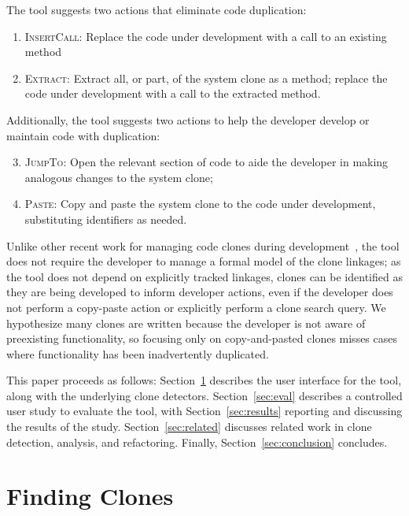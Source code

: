 \documentclass[nocopyrightspace,10pt]{sigplanconf}
\begin{document}
The tool suggests two actions that eliminate code duplication:

\begin{enumerate}
  \item \textsc{InsertCall}: Replace the code under development with a call to an existing method
  \item \textsc{Extract}: Extract all, or part, of the system clone as a method;
    replace the code under development with a call to the extracted
    method.
\end{enumerate}

\noindent Additionally, the tool suggests two actions to help the developer
develop or maintain code with duplication:

\begin{enumerate}
\setcounter{enumi}{2}
  \item \textsc{JumpTo}: Open the relevant section of code to aide the
    developer in making analogous changes to the system clone;
  \item \textsc{Paste}: Copy and paste the system clone to the code under development,
    substituting identifiers as needed.
\end{enumerate}

Unlike other recent work for managing code clones during
development~\cite{deWit2009, Duala-Ekoko2007}, the tool does not
require the developer to manage a formal model of the clone linkages;
as the tool does not depend on explicitly tracked linkages, clones can
be identified as they are being developed to inform developer actions,
even if the developer does not perform a copy-paste action or
explicitly perform a clone search query.  We hypothesize many clones 
are written because the developer is not aware of preexisting functionality,
 so focusing only on copy-and-pasted clones
misses cases where functionality has been inadvertently 
duplicated.

This paper proceeds as follows: Section~\ref{sec:finding-clones}
describes the user interface for the tool, along with the underlying
clone detectors. Section~\ref{sec:eval} describes a controlled user
study to evaluate the tool, with Section~\ref{sec:results}
reporting and discussing the results of the study.
Section~\ref{sec:related} discusses
related work in clone detection, analysis, and refactoring. Finally,
Section~\ref{sec:conclusion} concludes.

\section{Finding Clones}
\label{sec:finding-clones}
\end{document}
